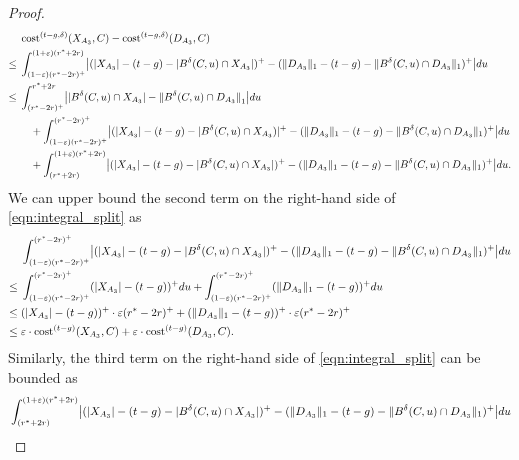 \documentclass[11pt,letterpaper]{article}
\theoremstyle{definition}
\newcommand{\eps}{\varepsilon}
\DeclarePairedDelimiter{\abs}{\lvert}{\rvert}
\DeclarePairedDelimiter{\norm}{\lVert}{\rVert}
\begin{document}
\begin{proof}
	\begin{equation}\label{eqn:integral_split}
    \begin{aligned}
		 & \cost[t-g,\delta](X_{A_3},C) - \cost[t-g,\delta](D_{A_3},C) \\
        \leq{} & 
        \int_{(1-\eps)(r^\ast-2r)^+}^{(1+\eps)(r^\ast+2r)} \abs*{(\abs{X_{A_3}} - (t-g) - \abs{B^\delta (C,u)\cap X_{A_3}})^+ - 
		  (\norm{D_{A_3}}_1 - (t-g) -  \norm{B^\delta(C,u)\cap D_{A_3}}_1)^+} du \\
    \leq{} &\int_{(r^\ast-2r)^+}^{r^\ast+2r} \abs*{ |B^\delta(C,u)\cap X_{A_3}|-\norm[big]{B^\delta(C,u)\cap D_{A_3}}_1 } du \\
		&\quad +\int_{(1-\eps)(r^\ast-2r)^+}^{(r^\ast-2r)^+} \abs[\big]{(\abs{X_{A_3}} - (t-g)-\abs{B^\delta(C,u)\cap X_{A_3})}^+-(\norm{D_{A_3}}_1 - (t-g)- \norm{B^\delta(C,u)\cap D_{A_3}}_1)^+} du \\
		&\quad +\int_{(r^\ast+2r)}^{(1+\eps)(r^\ast+2r)} \abs[\big]{(\abs{X_{A_3}} - (t-g)-\abs{B^\delta(C,u)\cap X_{A_3}})^+-(\norm{D_{A_3}}_1 - (t-g)- \norm{B^\delta(C,u)\cap D_{A_3}}_1)^+} du.
		\end{aligned}
	\end{equation}
	We can upper bound the second term on the right-hand side of \eqref{eqn:integral_split} as
	\begin{align*}
		&\int_{(1-\eps)(r^\ast-2r)^+}^{(r^\ast-2r)^+} \abs[\big]{(\abs{X_{A_3}}-(t-g)-\abs{B^\delta(C,u)\cap X_{A_3}})^+ - (\norm{D_{A_3}}_1 - (t-g)- \norm{B^\delta(C,u)\cap D_{A_3}}_1)^+} du \\
		\leq{} & \int_{(1-\eps)(r^\ast-2r)^+}^{(r^\ast-2r)^+} (\abs{X_{A_3}}-(t-g))^+ du + \int_{(1-\eps)(r^\ast-2r)^+}^{(r^\ast-2r)^+} (\norm{D_{A_3}}_1 - (t-g))^+ du \\
		\leq{} & (\abs{X_{A_3}}-(t-g))^+ \cdot \eps 
		(r^\ast-2r)^+  + (\norm{D_{A_3}}_1 - (t-g))^+ \cdot \eps (r^\ast-2r)^+\\
		\leq{} & \eps\cdot \cost[t-g](X_{A_3},C) + \eps\cdot \cost[t-g](D_{A_3},C).
	\end{align*}
	Similarly, the third term on the right-hand side of \eqref{eqn:integral_split} can be bounded as
	\begin{align*}
		&\int_{(r^\ast+2r)}^{(1+\eps)(r^\ast+2r)} \abs[\big]{(\abs{X_{A_3}} - (t-g)-\abs{B^\delta(C,u)\cap X_{A_3}})^+-(\norm{D_{A_3}}_1 - (t-g)- \norm{B^\delta(C,u)\cap D_{A_3}}_1)^+} du \\

\end{align*}
\end{proof}
\end{document}
